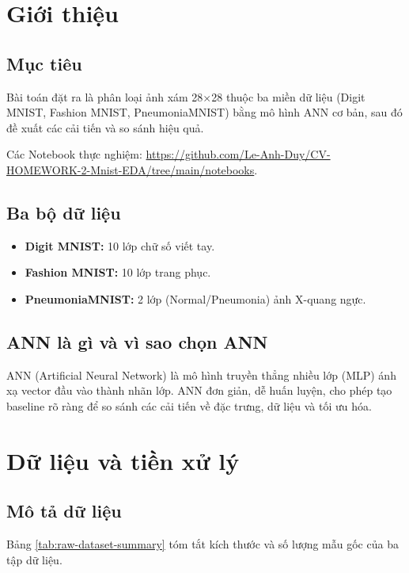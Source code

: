 \documentclass[a4paper,12pt]{report}
\begin{document}
\newpage
\tableofcontents
\newpage

\section{Giới thiệu}
\subsection{Mục tiêu}
Bài toán đặt ra là phân loại ảnh xám 28$\times$28 thuộc ba miền dữ liệu (Digit MNIST, Fashion MNIST, PneumoniaMNIST) bằng mô hình ANN cơ bản, sau đó đề xuất các cải tiến và so sánh hiệu quả.

Các Notebook thực nghiệm: \url{https://github.com/Le-Anh-Duy/CV-HOMEWORK-2-Mnist-EDA/tree/main/notebooks}.

\subsection{Ba bộ dữ liệu}
\begin{itemize}
    \item \textbf{Digit MNIST:} 10 lớp chữ số viết tay.
    \item \textbf{Fashion MNIST:} 10 lớp trang phục.
    \item \textbf{PneumoniaMNIST:} 2 lớp (Normal/Pneumonia) ảnh X-quang ngực.
\end{itemize}

\subsection{ANN là gì và vì sao chọn ANN}
ANN (Artificial Neural Network) là mô hình truyền thẳng nhiều lớp (MLP) ánh xạ vector đầu vào thành nhãn lớp. ANN đơn giản, dễ huấn luyện, cho phép tạo baseline rõ ràng để so sánh các cải tiến về đặc trưng, dữ liệu và tối ưu hóa.

\section{Dữ liệu và tiền xử lý}
\subsection{Mô tả dữ liệu}
Bảng \ref{tab:raw-dataset-summary} tóm tắt kích thước và số lượng mẫu gốc của ba tập dữ liệu.
\end{document}
